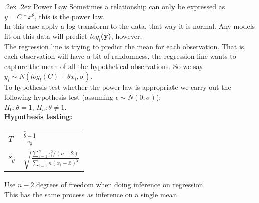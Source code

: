 \documentclass[10pt,landscape]{article}
\makeatletter
\renewcommand{\subsection}{\@startsection{subsection}{2}{0mm}%
                                {.2ex}%
                                {.2ex}%
                                {\normalfont\normalsize\bfseries}}
\makeatother
\begin{document}
\begin{multicols}{3}
        \subsection{Power Law}
        Sometimes a relationship can only be expressed as $y = C * x^\theta$, this is the power law. \\
        In this case apply a log transform to the data, that way it is normal. Any models fit on this data will predict \textbf{$log_{l}$(y)}, however. \\
        The regression line is trying to predict the mean for each observation. That is, each observation will have a bit of randomness, 
        the regression line wants to capture the mean of all the hypothetical observations. So we say $y_i \sim N(log_{l}(C) + \theta x_i, \sigma)$. \\
        To hypothesis test whether the power law is appropriate we carry out the following hypothesis test (assuming $\epsilon \sim N(0, \sigma)$): \\
        $H_0: \theta = 1$, $H_a: \theta \ne 1$. \\
        \textbf{Hypothesis testing:} \\
        \begin{tabular}{@{}p{\the\MyLen}%
                @{}p{\linewidth-\the\MyLen}@{}}
                $T$ & $\frac{\hat{\theta} - 1}{s_{\hat{\theta}}}$ \\
                $s_{\hat{\theta}}$ & $\sqrt{\frac{\sum_{i = 1}^n \epsilon_i^2 / (n - 2)}{\sum_{i = 1}{n}(x_i - \bar{x})^2}}$ 
        \end{tabular}
        Use $n - 2$ degrees of freedom when doing inference on regression. \\
        This has the same process as inference on a single mean. \\



\end{multicols}
\end{document}
